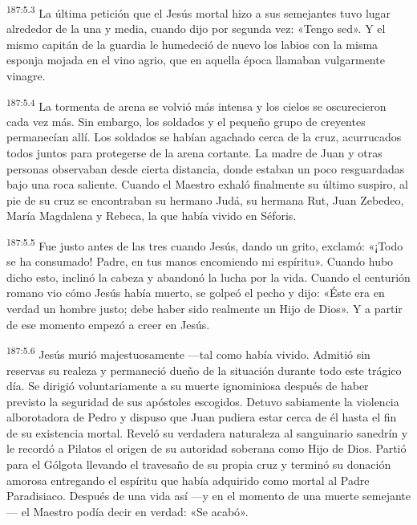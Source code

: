 \par 
\textsuperscript{187:5.3} La última petición que el Jesús mortal hizo a sus semejantes tuvo lugar alrededor de la una y media, cuando dijo por segunda vez: «Tengo sed». Y el mismo capitán de la guardia le humedeció de nuevo los labios con la misma esponja mojada en el vino agrio, que en aquella época llamaban vulgarmente vinagre.

\par 
\textsuperscript{187:5.4} La tormenta de arena se volvió más intensa y los cielos se oscurecieron cada vez más. Sin embargo, los soldados y el pequeño grupo de creyentes permanecían allí. Los soldados se habían agachado cerca de la cruz, acurrucados todos juntos para protegerse de la arena cortante. La madre de Juan y otras personas observaban desde cierta distancia, donde estaban un poco resguardadas bajo una roca saliente. Cuando el Maestro exhaló finalmente su último suspiro, al pie de su cruz se encontraban su hermano Judá, su hermana Rut, Juan Zebedeo, María Magdalena y Rebeca, la que había vivido en Séforis.

\par 
\textsuperscript{187:5.5} Fue justo antes de las tres cuando Jesús, dando un grito, exclamó: «¡Todo se ha consumado! Padre, en tus manos encomiendo mi espíritu». Cuando hubo dicho esto, inclinó la cabeza y abandonó la lucha por la vida. Cuando el centurión romano vio cómo Jesús había muerto, se golpeó el pecho y dijo: «Éste era en verdad un hombre justo; debe haber sido realmente un Hijo de Dios». Y a partir de ese momento empezó a creer en Jesús.

\par 
\textsuperscript{187:5.6} Jesús murió majestuosamente ---tal como había vivido. Admitió sin reservas su realeza y permaneció dueño de la situación durante todo este trágico día. Se dirigió voluntariamente a su muerte ignominiosa después de haber previsto la seguridad de sus apóstoles escogidos. Detuvo sabiamente la violencia alborotadora de Pedro y dispuso que Juan pudiera estar cerca de él hasta el fin de su existencia mortal. Reveló su verdadera naturaleza al sanguinario sanedrín y le recordó a Pilatos el origen de su autoridad soberana como Hijo de Dios. Partió para el Gólgota llevando el travesaño de su propia cruz y terminó su donación amorosa entregando el espíritu que había adquirido como mortal al Padre Paradisiaco. Después de una vida así ---y en el momento de una muerte semejante--- el Maestro podía decir en verdad: «Se acabó».

